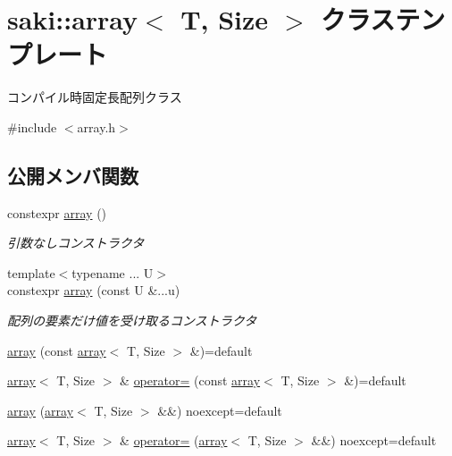 \hypertarget{classsaki_1_1array}{}\section{saki\+:\+:array$<$ T, Size $>$ クラステンプレート}
\label{classsaki_1_1array}


コンパイル時固定長配列クラス  




{\ttfamily \#include $<$array.\+h$>$}

\subsection*{公開メンバ関数}
\begin{DoxyCompactItemize}
\item 
constexpr \mbox{\hyperlink{classsaki_1_1array_a7da734ab08c73225f9358fa6e0294025}{array}} ()
\begin{DoxyCompactList}\small\item\em 引数なしコンストラクタ \end{DoxyCompactList}\item 
{\footnotesize template$<$typename ... U$>$ }\\constexpr \mbox{\hyperlink{classsaki_1_1array_a78ce1a324e430c40d828efd74c700719}{array}} (const U \&...u)
\begin{DoxyCompactList}\small\item\em 配列の要素だけ値を受け取るコンストラクタ \end{DoxyCompactList}\item 
\mbox{\hyperlink{classsaki_1_1array_a788262c2c0f097b6e8f1a9fbd6bf0034}{array}} (const \mbox{\hyperlink{classsaki_1_1array}{array}}$<$ T, Size $>$ \&)=default
\item 
\mbox{\hyperlink{classsaki_1_1array}{array}}$<$ T, Size $>$ \& \mbox{\hyperlink{classsaki_1_1array_aceb21e707471ccfc269c26138673e6ba}{operator=}} (const \mbox{\hyperlink{classsaki_1_1array}{array}}$<$ T, Size $>$ \&)=default
\item 
\mbox{\hyperlink{classsaki_1_1array_a94b434b999e60647e03a8f3920f66a6d}{array}} (\mbox{\hyperlink{classsaki_1_1array}{array}}$<$ T, Size $>$ \&\&) noexcept=default
\item 
\mbox{\hyperlink{classsaki_1_1array}{array}}$<$ T, Size $>$ \& \mbox{\hyperlink{classsaki_1_1array_a437960c16333970285d7a66e34ca6923}{operator=}} (\mbox{\hyperlink{classsaki_1_1array}{array}}$<$ T, Size $>$ \&\&) noexcept=default

\end{DoxyCompactItemize}
